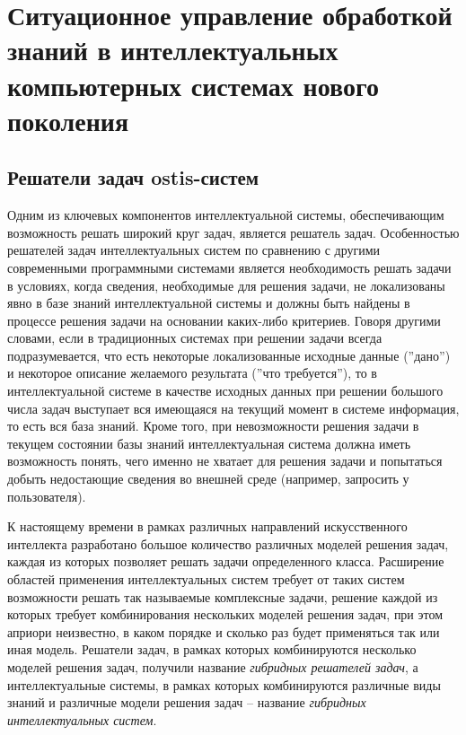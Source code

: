 \chapter{Ситуационное управление обработкой знаний в интеллектуальных компьютерных системах нового поколения}
\label{chapter_situation_management}


\section{Решатели задач ostis-систем}

Одним из ключевых компонентов интеллектуальной системы, обеспечивающим возможность решать широкий круг задач, является решатель задач. Особенностью решателей задач интеллектуальных систем по сравнению с другими современными программными системами является необходимость решать задачи в условиях, когда сведения, необходимые для решения задачи, не локализованы явно в базе знаний интеллектуальной системы и должны быть найдены в процессе решения задачи на основании каких-либо критериев. Говоря другими словами, если в традиционных системах при решении задачи всегда подразумевается, что есть некоторые локализованные исходные данные (''дано'') и некоторое описание желаемого результата (''что требуется''), то в интеллектуальной системе в качестве исходных данных при решении большого числа задач выступает вся имеющаяся на текущий момент в системе информация, то есть вся база знаний. Кроме того, при невозможности решения задачи в текущем состоянии базы знаний интеллектуальная система должна иметь возможность понять, чего именно не хватает для решения задачи и попытаться добыть недостающие сведения во внешней среде (например, запросить у пользователя).

К настоящему времени в рамках различных направлений искусственного интеллекта разработано большое количество различных моделей решения задач, каждая из которых позволяет решать задачи определенного класса. Расширение областей применения интеллектуальных систем требует от таких систем возможности решать так называемые комплексные задачи, решение каждой из которых требует комбинирования нескольких моделей решения задач, при этом априори неизвестно, в каком порядке и сколько раз будет применяться так или иная модель. Решатели задач, в рамках которых комбинируются несколько моделей решения задач, получили название \textit{гибридных решателей задач}, а интеллектуальные системы, в рамках которых комбинируются различные виды знаний и различные модели решения задач -- название \textit{гибридных интеллектуальных систем}.

